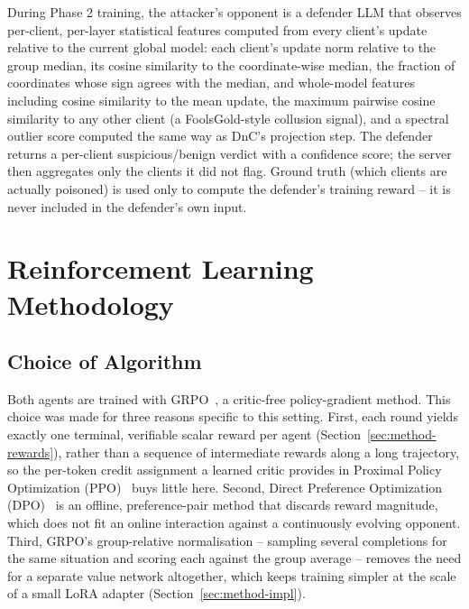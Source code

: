During Phase 2 training, the attacker's opponent is a defender LLM that observes per-client, per-layer statistical features computed from every client's update relative to the current global model: each client's update norm relative to the group median, its cosine similarity to the coordinate-wise median, the fraction of coordinates whose sign agrees with the median, and whole-model features including cosine similarity to the mean update, the maximum pairwise cosine similarity to any other client (a FoolsGold-style collusion signal), and a spectral outlier score computed the same way as DnC's projection step. The defender returns a per-client suspicious/benign verdict with a confidence score; the server then aggregates only the clients it did not flag. Ground truth (which clients are actually poisoned) is used only to compute the defender's training reward -- it is never included in the defender's own input.

\section{Reinforcement Learning Methodology}
\label{sec:method-rl}

\subsection{Choice of Algorithm}
Both agents are trained with GRPO~\citep{grpo}, a critic-free policy-gradient method. This choice was made for three reasons specific to this setting. First, each round yields exactly one terminal, verifiable scalar reward per agent (Section~\ref{sec:method-rewards}), rather than a sequence of intermediate rewards along a long trajectory, so the per-token credit assignment a learned critic provides in Proximal Policy Optimization (PPO)~\citep{ppo,ouyang2022} buys little here. Second, Direct Preference Optimization (DPO)~\citep{dpo} is an offline, preference-pair method that discards reward magnitude, which does not fit an online interaction against a continuously evolving opponent. Third, GRPO's group-relative normalisation -- sampling several completions for the same situation and scoring each against the group average -- removes the need for a separate value network altogether, which keeps training simpler at the scale of a small LoRA adapter (Section~\ref{sec:method-impl}).

